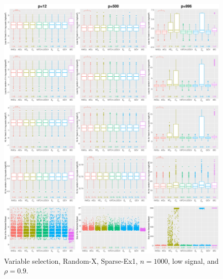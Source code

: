 \begin{figure}[!ht]
\centering
\includegraphics[width=\textwidth]{figures/supplement/randomx/subset_selection/Sparse-Ex1_n1000_lsnr_rho09.eps}
\caption{Variable selection, Random-X, Sparse-Ex1, $n=1000$, low signal, and $\rho=0.9$.}
\end{figure}
\clearpage
